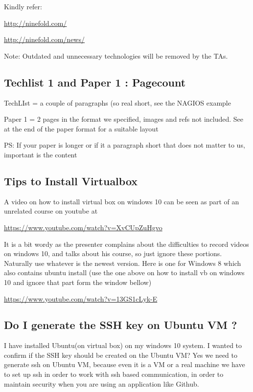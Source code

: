 Kindly refer:

\url{http://ninefold.com/}

\url{http://ninefold.com/news/}

Note: Outdated and unnecessary technologies will be removed by the TAs.


\subsection{Techlist 1 and Paper 1 : Pagecount}
\label{\detokenize{faq:techlist-1-and-paper-1-pagecount}}
TechLIst = a couple of paragraphs (so real short, see the NAGIOS example

Paper 1 = 2 pages in the format we specified, images and refs not included. See at the end of the paper format for a suitable layout

PS: If your paper is longer or if it a paragraph short that does not matter to us, important is the content


\subsection{Tips to Install Virtualbox}
\label{\detokenize{faq:tips-to-install-virtualbox}}
A video on how to install virtual box on windows 10 can be seen as part of an unrelated course on youtube at

\url{https://www.youtube.com/watch?v=XvCUpZuHgvo}

It is a bit wordy as the presenter complains about the difficulties to
record videos on windows 10, and talks about his course, so just
ignore these portions. Naturally use whatever is the newest
version. Here is one for Windows 8 which also contains ubuntu install
(use the one above on how to install vb on windows 10 and ignore that
part form the window bellow)

\url{https://www.youtube.com/watch?v=13GS1cLyk-E}


\subsection{Do I generate the SSH key on Ubuntu VM ?}
\label{\detokenize{faq:do-i-generate-the-ssh-key-on-ubuntu-vm}}
I have installed Ubuntu(on virtual box) on my windows 10 system. I
wanted to confirm if the SSH key should be created on the Ubuntu VM?
Yes we need to generate ssh on Ubuntu VM, because even it is a VM or a
real machine we have to set up ssh in order to work with ssh based
communication, in order to maintain security when you are using an
application like Github.

